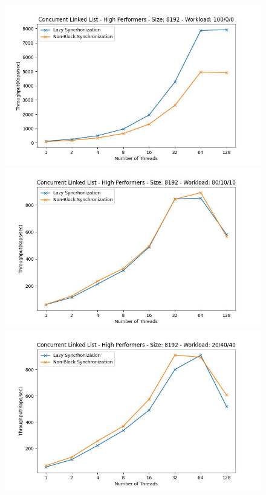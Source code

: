\documentclass[../final_report.tex]{subfiles}
\begin{document}
\begin{figure}[H]
    \centering
        \includegraphics[scale=0.4]{outFiles/plots/concurrent_data_structs_high_8192_100_0_0.jpg}
        \includegraphics[scale=0.4]{outFiles/plots/concurrent_data_structs_high_8192_80_10_10.jpg}
        \includegraphics[scale=0.4]{outFiles/plots/concurrent_data_structs_high_8192_20_40_40.jpg}

\end{figure}
\end{document}
